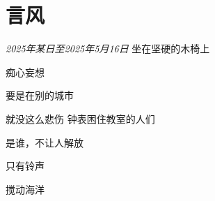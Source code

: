 \section*{言风}
\begin{center}
\textit{2025年某日至2025年5月16日}\hh 
坐在坚硬的木椅上

痴心妄想

要是在别的城市

就没这么悲伤\hh
钟表困住教室的人们

是谁，不让人解放

只有铃声

搅动海洋
\end{center}